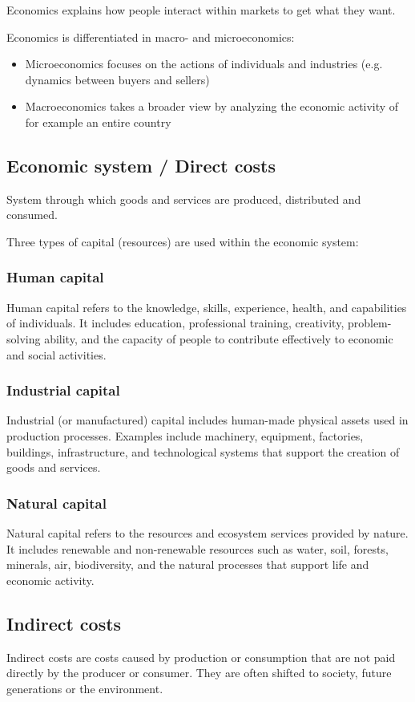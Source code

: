 \documentclass{article}
\begin{document}
Economics explains how people interact within markets to get what
they want.

Economics is differentiated in macro- and microeconomics:
\begin{itemize}
    \item Microeconomics focuses on the actions of individuals and industries (e.g. dynamics between buyers and sellers)
    \item Macroeconomics takes a broader view by analyzing the economic activity of for example an entire country
\end{itemize}

\subsection{Economic system / Direct costs}
System through which goods and services are produced, distributed and consumed.

Three types of capital (resources) are used within the economic system:
\subsubsection{Human capital}
Human capital refers to the knowledge, skills, experience, health,
and capabilities of individuals. It includes education, professional
training, creativity, problem-solving ability, and the capacity of
people to contribute effectively to economic and social activities.

\subsubsection{Industrial capital}
Industrial (or manufactured) capital includes human-made physical
assets used in production processes. Examples include machinery,
equipment, factories, buildings, infrastructure, and technological
systems that support the creation of goods and services.

\subsubsection{Natural capital}
Natural capital refers to the resources and ecosystem services
provided by nature. It includes renewable and non-renewable
resources such as water, soil, forests, minerals, air, biodiversity,
and the natural processes that support life and economic activity.

\subsection{Indirect costs}
Indirect costs are costs caused by production or consumption that are
not paid directly by the producer or consumer. They are often shifted
to society, future generations or the environment.
\end{document}
